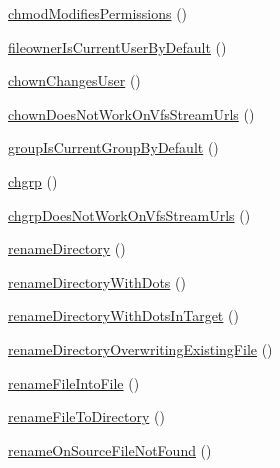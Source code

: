 \begin{DoxyCompactItemize}
\item 
\mbox{\hyperlink{classorg_1_1bovigo_1_1vfs_1_1vfs_stream_wrapper_test_case_a7c4728fd78babc6447993c41e0016c65}{chmod\+Modifies\+Permissions}} ()
\item 
\mbox{\hyperlink{classorg_1_1bovigo_1_1vfs_1_1vfs_stream_wrapper_test_case_a9308ac30d1dfde6626c320781458c4fb}{fileowner\+Is\+Current\+User\+By\+Default}} ()
\item 
\mbox{\hyperlink{classorg_1_1bovigo_1_1vfs_1_1vfs_stream_wrapper_test_case_aa46aee1bd9cc3c55d9fd4d3534d4eeeb}{chown\+Changes\+User}} ()
\item 
\mbox{\hyperlink{classorg_1_1bovigo_1_1vfs_1_1vfs_stream_wrapper_test_case_a5ec45d833ffd7698da74733fe869db52}{chown\+Does\+Not\+Work\+On\+Vfs\+Stream\+Urls}} ()
\item 
\mbox{\hyperlink{classorg_1_1bovigo_1_1vfs_1_1vfs_stream_wrapper_test_case_a6818ec87acf0dbb4b51a7e9a1db27c69}{group\+Is\+Current\+Group\+By\+Default}} ()
\item 
\mbox{\hyperlink{classorg_1_1bovigo_1_1vfs_1_1vfs_stream_wrapper_test_case_acb1f7d2fc524cec8a7c57355a4afc4ac}{chgrp}} ()
\item 
\mbox{\hyperlink{classorg_1_1bovigo_1_1vfs_1_1vfs_stream_wrapper_test_case_aa98bf76c4684f60a277c654ca265a34a}{chgrp\+Does\+Not\+Work\+On\+Vfs\+Stream\+Urls}} ()
\item 
\mbox{\hyperlink{classorg_1_1bovigo_1_1vfs_1_1vfs_stream_wrapper_test_case_aa1e614d1ab100c5ba22eaa4b9af7baf5}{rename\+Directory}} ()
\item 
\mbox{\hyperlink{classorg_1_1bovigo_1_1vfs_1_1vfs_stream_wrapper_test_case_a07b5be41021ef7ce55f3cb7dd0174ffd}{rename\+Directory\+With\+Dots}} ()
\item 
\mbox{\hyperlink{classorg_1_1bovigo_1_1vfs_1_1vfs_stream_wrapper_test_case_a99bd5490972de0b414dc2a1c8d02f3a3}{rename\+Directory\+With\+Dots\+In\+Target}} ()
\item 
\mbox{\hyperlink{classorg_1_1bovigo_1_1vfs_1_1vfs_stream_wrapper_test_case_ae7c9fe44eb6a7d06d23dce7b1382f47f}{rename\+Directory\+Overwriting\+Existing\+File}} ()
\item 
\mbox{\hyperlink{classorg_1_1bovigo_1_1vfs_1_1vfs_stream_wrapper_test_case_a3f24262cef7086cef33ac9b7826e9b5d}{rename\+File\+Into\+File}} ()
\item 
\mbox{\hyperlink{classorg_1_1bovigo_1_1vfs_1_1vfs_stream_wrapper_test_case_aef9400ce6368d09c13fef562946ddaa7}{rename\+File\+To\+Directory}} ()
\item 
\mbox{\hyperlink{classorg_1_1bovigo_1_1vfs_1_1vfs_stream_wrapper_test_case_acadfd0906b3d3fcc4fb91fa5c11e0096}{rename\+On\+Source\+File\+Not\+Found}} ()

\end{DoxyCompactItemize}

